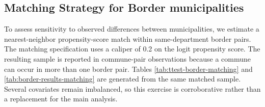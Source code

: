 \begin{appendices}
\section{Matching Strategy for Border municipalities}
\label{app:border-matching}

To assess sensitivity to observed differences between municipalities, we estimate a nearest-neighbor propensity-score match within same-department border pairs. The matching specification uses a caliper of 0.2 on the logit propensity score. The resulting sample is reported in commune-pair observations because a commune can occur in more than one border pair. Tables \ref{tab:ttest-border-matching} and \ref{tab:border-results-matching} are generated from the same matched sample. Several covariates remain imbalanced, so this exercise is corroborative rather than a replacement for the main analysis.





\end{appendices}
